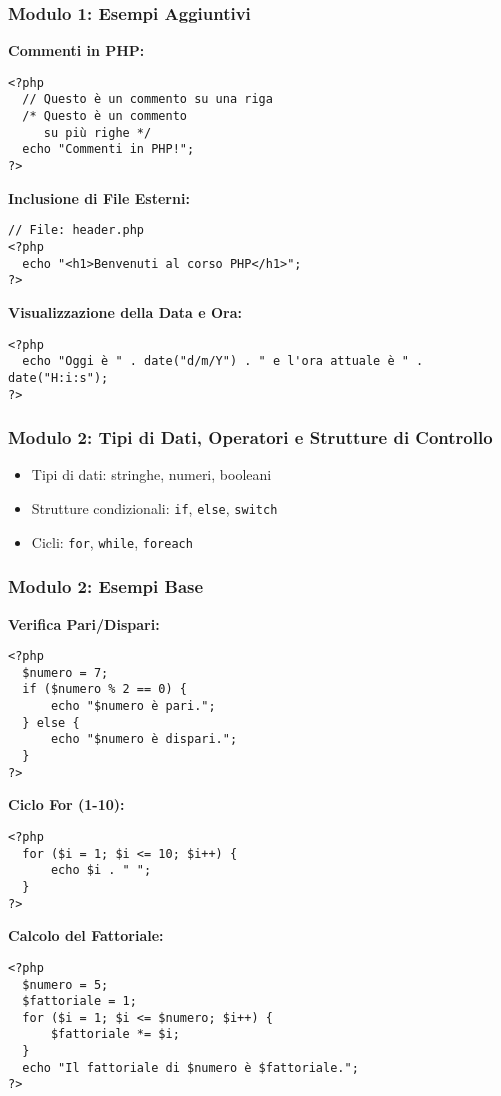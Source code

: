 \documentclass{beamer}
\begin{document}
\begin{frame}[fragile]
\frametitle{Modulo 1: Esempi Aggiuntivi}
\textbf{Commenti in PHP:}
\begin{lstlisting}
<?php
  // Questo è un commento su una riga
  /* Questo è un commento
     su più righe */
  echo "Commenti in PHP!";
?>
\end{lstlisting}
\vspace{0.5em}
\textbf{Inclusione di File Esterni:}
\begin{lstlisting}
// File: header.php
<?php
  echo "<h1>Benvenuti al corso PHP</h1>";
?>
\end{lstlisting}
\vspace{0.5em}
\textbf{Visualizzazione della Data e Ora:}
\begin{lstlisting}
<?php
  echo "Oggi è " . date("d/m/Y") . " e l'ora attuale è " . date("H:i:s");
?>
\end{lstlisting}
\end{frame}


\begin{frame}
\frametitle{Modulo 2: Tipi di Dati, Operatori e Strutture di Controllo}
\begin{itemize}
    \item Tipi di dati: stringhe, numeri, booleani
    \item Strutture condizionali: \texttt{if}, \texttt{else}, \texttt{switch}
    \item Cicli: \texttt{for}, \texttt{while}, \texttt{foreach}
\end{itemize}
\end{frame}

\begin{frame}[fragile]
\frametitle{Modulo 2: Esempi Base}
\textbf{Verifica Pari/Dispari:}
\begin{lstlisting}
<?php
  $numero = 7;
  if ($numero % 2 == 0) {
      echo "$numero è pari.";
  } else {
      echo "$numero è dispari.";
  }
?>
\end{lstlisting}
\vspace{0.5em}
\textbf{Ciclo For (1-10):}
\begin{lstlisting}
<?php
  for ($i = 1; $i <= 10; $i++) {
      echo $i . " ";
  }
?>
\end{lstlisting}
\vspace{0.5em}
\textbf{Calcolo del Fattoriale:}
\begin{lstlisting}
<?php
  $numero = 5;
  $fattoriale = 1;
  for ($i = 1; $i <= $numero; $i++) {
      $fattoriale *= $i;
  }
  echo "Il fattoriale di $numero è $fattoriale.";
?>
\end{lstlisting}
\end{frame}
\end{document}
